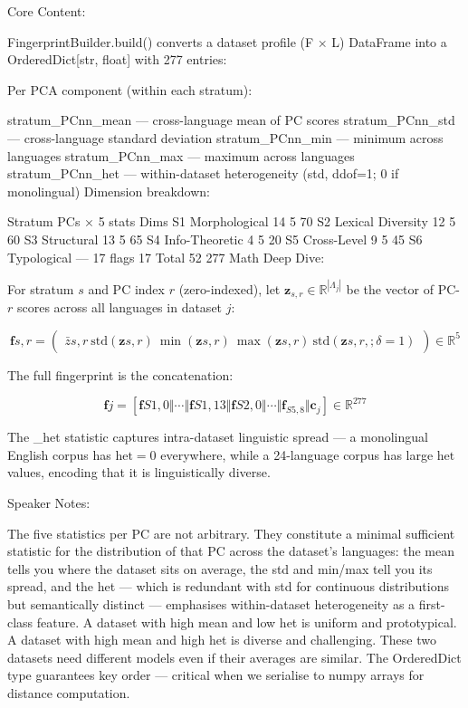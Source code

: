Core Content:

FingerprintBuilder.build() converts a dataset profile (F × L) DataFrame into a OrderedDict[str, float] with 277 entries:

Per PCA component (within each stratum):

{stratum}_PC{nn}_mean — cross-language mean of PC scores
{stratum}_PC{nn}_std — cross-language standard deviation
{stratum}_PC{nn}_min — minimum across languages
{stratum}_PC{nn}_max — maximum across languages
{stratum}_PC{nn}_het — within-dataset heterogeneity (std, ddof=1; 0 if monolingual)
Dimension breakdown:

Stratum	PCs	× 5 stats	Dims
S1 Morphological	14	5	70
S2 Lexical Diversity	12	5	60
S3 Structural	13	5	65
S4 Info-Theoretic	4	5	20
S5 Cross-Level	9	5	45
S6 Typological	—	17 flags	17
Total	52		277
Math Deep Dive:

For stratum $s$ and PC index $r$ (zero-indexed), let $\mathbf{z}_{s,r} \in \mathbb{R}^{|\Lambda_j|}$ be the vector of PC-$r$ scores across all languages in dataset $j$:

$$\mathbf{f}{s,r} = \begin{pmatrix} \bar{z}{s,r} \ \text{std}(\mathbf{z}{s,r}) \ \min(\mathbf{z}{s,r}) \ \max(\mathbf{z}{s,r}) \ \text{std}(\mathbf{z}{s,r},; \delta=1) \end{pmatrix} \in \mathbb{R}^5$$

The full fingerprint is the concatenation:

$$\mathbf{f}j = \left[\mathbf{f}{S1,0} \Vert \cdots \Vert \mathbf{f}{S1,13} \Vert \mathbf{f}{S2,0} \Vert \cdots \Vert \mathbf{f}_{S5,8} \Vert \mathbf{c}_j\right] \in \mathbb{R}^{277}$$

The _het statistic captures intra-dataset linguistic spread — a monolingual English corpus has $\text{het} = 0$ everywhere, while a 24-language corpus has large $\text{het}$ values, encoding that it is linguistically diverse.

Speaker Notes:

The five statistics per PC are not arbitrary. They constitute a minimal sufficient statistic for the distribution of that PC across the dataset's languages: the mean tells you where the dataset sits on average, the std and min/max tell you its spread, and the het — which is redundant with std for continuous distributions but semantically distinct — emphasises within-dataset heterogeneity as a first-class feature. A dataset with high mean and low het is uniform and prototypical. A dataset with high mean and high het is diverse and challenging. These two datasets need different models even if their averages are similar. The OrderedDict type guarantees key order — critical when we serialise to numpy arrays for distance computation.

